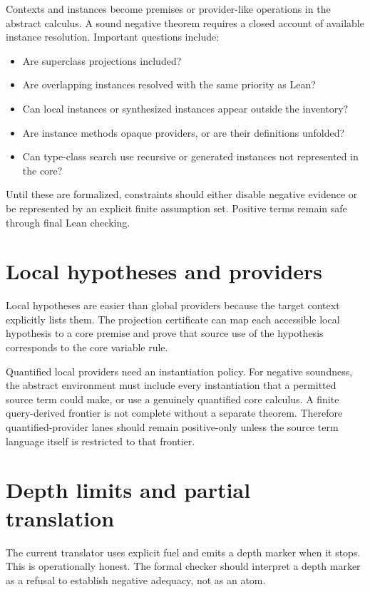\documentclass[11pt,letterpaper,openany]{report}
\theoremstyle{definition}
\theoremstyle{remark}
\begin{document}
Contexts and instances become premises or provider-like operations in the abstract calculus. A sound negative theorem requires a closed account of available instance resolution. Important questions include:

\begin{itemize}
\item Are superclass projections included?
\item Are overlapping instances resolved with the same priority as Lean?
\item Can local instances or synthesized instances appear outside the inventory?
\item Are instance methods opaque providers, or are their definitions unfolded?
\item Can type-class search use recursive or generated instances not represented in the core?
\end{itemize}

Until these are formalized, constraints should either disable negative evidence or be represented by an explicit finite assumption set. Positive terms remain safe through final Lean checking.

\section{Local hypotheses and providers}

Local hypotheses are easier than global providers because the target context explicitly lists them. The projection certificate can map each accessible local hypothesis to a core premise and prove that source use of the hypothesis corresponds to the core variable rule.

Quantified local providers need an instantiation policy. For negative soundness, the abstract environment must include every instantiation that a permitted source term could make, or use a genuinely quantified core calculus. A finite query-derived frontier is not complete without a separate theorem. Therefore quantified-provider lanes should remain positive-only unless the source term language itself is restricted to that frontier.

\section{Depth limits and partial translation}

The current translator uses explicit fuel and emits a depth marker when it stops. This is operationally honest. The formal checker should interpret a depth marker as a refusal to establish negative adequacy, not as an atom.
\end{document}
